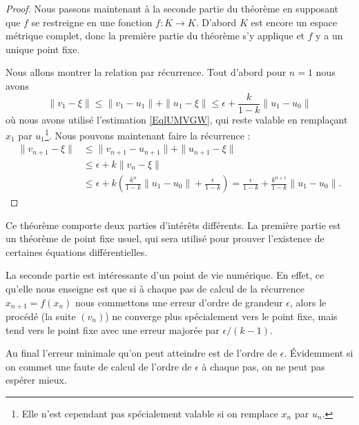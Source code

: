 \begin{proof}
	Nous passons maintenant à la seconde partie du théorème en supposant que \( f\) se restreigne en une fonction \( f\colon K\to K\). D'abord \( K\) est encore un espace métrique complet, donc la première partie du théorème s'y applique et \( f\) y a un unique point fixe.

	Nous allons montrer la relation par récurrence. Tout d'abord pour \( n=1\) nous avons
	\begin{equation}
		\| v_1-\xi \|\leq\| v_1-u_1 \|+\| u_1-\xi \|\leq \epsilon+\frac{ k }{ 1-k }\| u_1-u_0 \|
	\end{equation}
	où nous avons utilisé l'estimation \eqref{EqlUMVGW}, qui reste valable en remplaçant \( x_1\) par \( u_1\)\footnote{Elle n'est cependant pas spécialement valable si on remplace \( x_n\) par \( u_n\).}. Nous pouvons maintenant faire la récurrence :
	\begin{subequations}
		\begin{align}
			\| v_{n+1}-\xi \| & \leq  \| v_{n+1}-u_{n+1} \|+\| u_{n+1}-\xi \|                                            \\
			                  & \leq  \epsilon+k\| v_n-\xi \|                                                            \\
			                  & \leq  \epsilon+k\left( \frac{ k^n }{ 1-k }\| u_1-u_0 \|+\frac{ \epsilon }{ 1-k } \right)
			=   \frac{ \epsilon }{ 1-k }+\frac{ k^{n+1} }{ 1-k }\| u_1-u_0 \|.
		\end{align}
	\end{subequations}
\end{proof}

\begin{remark}
	Ce théorème comporte deux parties d'intérêts différents. La première partie est un théorème de point fixe usuel, qui sera utilisé pour prouver l'existence de certaines équations différentielles.

	La seconde partie est intéressante d'un point de vie numérique. En effet, ce qu'elle nous enseigne est que si à chaque pas de calcul de la récurrence \( x_{n+1}=f(x_n)\) nous commettons une erreur d'ordre de grandeur \( \epsilon\), alors le procédé (la suite \( (v_n)\)) ne converge plus spécialement vers le point fixe, mais tend vers le point fixe avec une erreur majorée par \( \epsilon/(k-1)\).
\end{remark}

\begin{remark}
	Au final l'erreur minimale qu'on peut atteindre est de l'ordre de \( \epsilon\). Évidemment si on commet une faute de calcul de l'ordre de \( \epsilon\) à chaque pas, on ne peut pas espérer mieux.
\end{remark}

